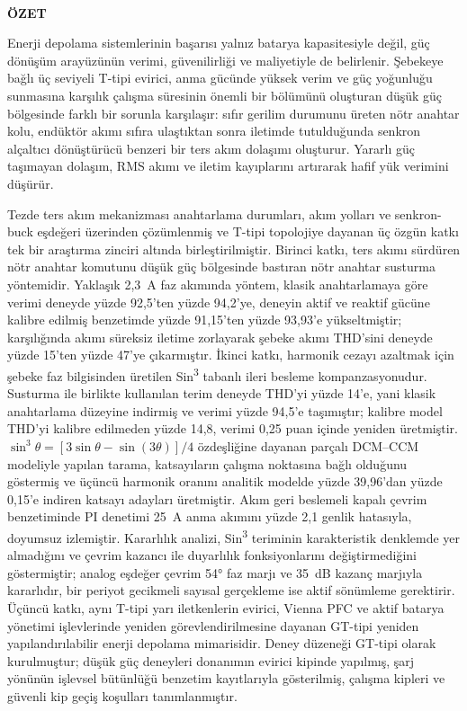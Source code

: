 \cleardoublepage
\thispagestyle{plain}
\begingroup
\singlespacing

\vspace*{72pt}
\begin{center}
  \bfseries\MakeUppercase{\TezBasligi}\\[18pt]
  ÖZET
\end{center}

Enerji depolama sistemlerinin başarısı yalnız batarya kapasitesiyle değil, güç dönüşüm arayüzünün verimi, güvenilirliği ve maliyetiyle de belirlenir. Şebekeye bağlı üç seviyeli T-tipi evirici, anma gücünde yüksek verim ve güç yoğunluğu sunmasına karşılık çalışma süresinin önemli bir bölümünü oluşturan düşük güç bölgesinde farklı bir sorunla karşılaşır: sıfır gerilim durumunu üreten nötr anahtar kolu, endüktör akımı sıfıra ulaştıktan sonra iletimde tutulduğunda senkron alçaltıcı dönüştürücü benzeri bir ters akım dolaşımı oluşturur. Yararlı güç taşımayan dolaşım, RMS akımı ve iletim kayıplarını artırarak hafif yük verimini düşürür.

Tezde ters akım mekanizması anahtarlama durumları, akım yolları ve senkron-buck eşdeğeri üzerinden çözümlenmiş ve T-tipi topolojiye dayanan üç özgün katkı tek bir araştırma zinciri altında birleştirilmiştir. Birinci katkı, ters akımı sürdüren nötr anahtar komutunu düşük güç bölgesinde bastıran nötr anahtar susturma yöntemidir. Yaklaşık 2,3~A faz akımında yöntem, klasik anahtarlamaya göre verimi deneyde yüzde 92,5'ten yüzde 94,2'ye, deneyin aktif ve reaktif gücüne kalibre edilmiş benzetimde yüzde 91,15'ten yüzde 93,93'e yükseltmiştir; karşılığında akımı süreksiz iletime zorlayarak şebeke akımı THD'sini deneyde yüzde 15'ten yüzde 47'ye çıkarmıştır. İkinci katkı, harmonik cezayı azaltmak için şebeke faz bilgisinden üretilen Sin\textsuperscript{3} tabanlı ileri besleme kompanzasyonudur. Susturma ile birlikte kullanılan terim deneyde THD'yi yüzde 14'e, yani klasik anahtarlama düzeyine indirmiş ve verimi yüzde 94,5'e taşımıştır; kalibre model THD'yi kalibre edilmeden yüzde 14,8, verimi 0,25 puan içinde yeniden üretmiştir. $\sin^3\theta=[3\sin\theta-\sin(3\theta)]/4$ özdeşliğine dayanan parçalı DCM--CCM modeliyle yapılan tarama, katsayıların çalışma noktasına bağlı olduğunu göstermiş ve üçüncü harmonik oranını analitik modelde yüzde 39,96'dan yüzde 0,15'e indiren katsayı adayları üretmiştir. Akım geri beslemeli kapalı çevrim benzetiminde PI denetimi 25~A anma akımını yüzde 2,1 genlik hatasıyla, doyumsuz izlemiştir. Kararlılık analizi, Sin\textsuperscript{3} teriminin karakteristik denklemde yer almadığını ve çevrim kazancı ile duyarlılık fonksiyonlarını değiştirmediğini göstermiştir; analog eşdeğer çevrim 54° faz marjı ve 35~dB kazanç marjıyla kararlıdır, bir periyot gecikmeli sayısal gerçekleme ise aktif sönümleme gerektirir. Üçüncü katkı, aynı T-tipi yarı iletkenlerin evirici, Vienna PFC ve aktif batarya yönetimi işlevlerinde yeniden görevlendirilmesine dayanan GT-tipi yeniden yapılandırılabilir enerji depolama mimarisidir. Deney düzeneği GT-tipi olarak kurulmuştur; düşük güç deneyleri donanımın evirici kipinde yapılmış, şarj yönünün işlevsel bütünlüğü benzetim kayıtlarıyla gösterilmiş, çalışma kipleri ve güvenli kip geçiş koşulları tanımlanmıştır.

